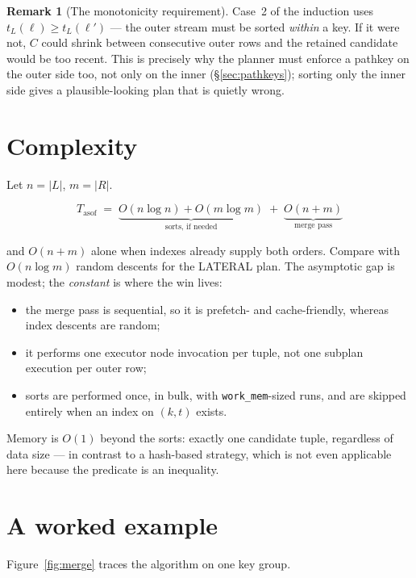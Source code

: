 \documentclass[11pt,a4paper]{report}
\theoremstyle{definition}
\newtheorem{remark}[definition]{Remark}
\theoremstyle{plain}
\newcommand{\code}[1]{\texttt{\small #1}}
\begin{document}
\begin{remark}[The monotonicity requirement]
Case~2 of the induction uses $t_L(\ell) \ge t_L(\ell')$ --- the outer stream must be sorted
\emph{within} a key. If it were not, $C$ could shrink between consecutive outer rows and the
retained candidate would be too recent. This is precisely why the planner must enforce a
pathkey on the outer side too, not only on the inner (\S\ref{sec:pathkeys}); sorting only
the inner side gives a plausible-looking plan that is quietly wrong.
\end{remark}

\section{Complexity}

Let $n = |L|$, $m = |R|$.

\[
  T_{\text{asof}} \;=\;
  \underbrace{O(n \log n) + O(m \log m)}_{\text{sorts, if needed}}
  \;+\;
  \underbrace{O(n + m)}_{\text{merge pass}}
\]

and $O(n + m)$ alone when indexes already supply both orders. Compare with
$O(n \log m)$ random descents for the LATERAL plan. The asymptotic gap is modest; the
\emph{constant} is where the win lives:

\begin{itemize}[nosep]
\item the merge pass is sequential, so it is prefetch- and cache-friendly, whereas index
      descents are random;
\item it performs one executor node invocation per tuple, not one subplan execution per
      outer row;
\item sorts are performed once, in bulk, with \code{work\_mem}-sized runs, and are
      skipped entirely when an index on $(k, t)$ exists.
\end{itemize}

Memory is $O(1)$ beyond the sorts: exactly one candidate tuple, regardless of data size ---
in contrast to a hash-based strategy, which is not even applicable here because the
predicate is an inequality.

\section{A worked example}

Figure~\ref{fig:merge} traces the algorithm on one key group.
\end{document}
